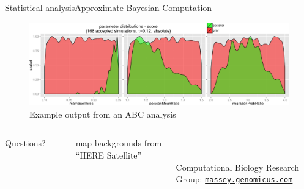 \documentclass[10pt, aspectratio=43]{beamer}
\begin{document}
\begin{frame}{Statistical analysis}{Approximate Bayesian Computation}
\begin{center}
  \begin{figure}
    \hspace*{-0.85cm}
    \includegraphics[width=1.15\textwidth]{../data/abc-priors-posteriors.png}
    \caption{Example output from an ABC analysis}
  \end{figure}
\end{center}
\end{frame}


\begin{frame}[plain]
\begin{columns}
    \tableofcontents[subsubsectionstyle=hide]

    \begin{Huge}
      Questions?
    \end{Huge}
    \\~\\~\\~\\~\\
    \begin{small}
      \color{lightgray}
      map backgrounds from “HERE Satellite”
    \end{small}
    \\~\\
    Computational Biology Research Group: \href{http://massey.genomicus.com}{\texttt{massey.genomicus.com}}

\end{columns}
\end{frame}

\end{document}
